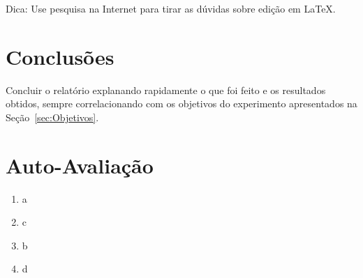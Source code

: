 \documentclass[12pt]{article}
\begin{document}
Dica: Use pesquisa na Internet para tirar as dúvidas sobre edição em \LaTeX .

\section{Conclusões}
\label{sec:Conclusao}

Concluir o relatório explanando rapidamente o que foi feito e os resultados obtidos, sempre correlacionando com os objetivos do experimento apresentados na Seção~\ref{sec:Objetivos}. 





\newpage 
\section*{Auto-Avaliação}

\begin{enumerate}
    \item a
    \item c
    \item b
    \item d
\end{enumerate}
\end{document}
